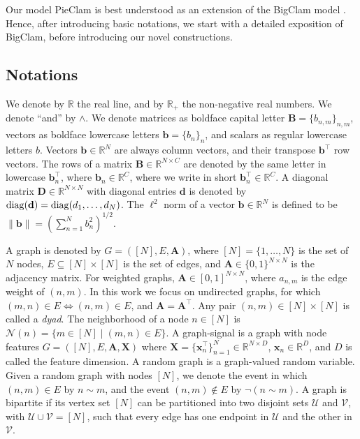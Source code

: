 \documentclass[letterpaper]{article} %
\begin{document}
Our model PieClam is best understood as an extension of the BigClam model \cite{Overlapping2012}. Hence, after introducing basic notations, we start with a detailed exposition of BigClam, before introducing our novel constructions.


\subsection{Notations}
\label{def:notations}
We denote by $\mathbb{R}$ the real line, and by $\mathbb{R}_+$ the non-negative real numbers. We denote ``and'' by $\wedge$.
We denote matrices as boldface capital letter $\mathbf{B}=\{b_{n,m}\}_{n,m}$, vectors as boldface lowercase letters $\mathbf{b}=\{b_n\}_n$,  and scalars as regular lowercase letters $b$. Vectors $\mathbf{b}\in\mathbb{R}^N$ are always column vectors, and their transpose $\mathbf{b}^{\top }$ row vectors. The rows of a matrix $\mathbf{B}\in\mathbb{R}^{N\times C}$ are denoted by the same letter in lowercase $\mathbf{b}_n^{\top }$, where $\mathbf{b}_n\in\mathbb{R}^C$, where we write in short $\mathbf{b}_n^{\top }\in\mathbb{R}^C$. A diagonal matrix $\mathbf{D}\in\mathbb{R}^{N\times N}$ with diagonal entries $\mathbf{d}$ is denoted by ${\rm diag}(\mathbf{d})={\rm diag}(d_1,\ldots, d_N)$.  The $\ell^2$ norm of a vector $\mathbf{b} \in \mathbb{R}^N$ is defined to be $\|\mathbf{b}\| = (\sum_{n=1}^Nb_n^2)^{1/2}$. 

A graph is denoted by $G=([N],E,\mathbf{A})$, where $[N]=\{1,\ldots, N\}$ is the set of $N$ nodes,  $E\subseteq [N]\times[N]$ is the set of edges, and $\mathbf{A}\in \{0,1\}^{N\times N}$ is the adjacency matrix. For weighted graphs, $\mathbf{A}\in[0,1]^{N\times N}$, where $a_{n,m}$ is the edge weight of $(n,m)$.
In this work we focus on undirected graphs, for which $(m,n)\in E \Leftrightarrow (n,m)\in E$, and $\mathbf{A}=\mathbf{A}^{\top }$.  
%
Any pair $(n, m)\in [N]\times[N]$ is called a \emph{dyad}.
The neighborhood of a node $n\in[N]$ is  $\mathcal{N}(n)  = \{m \in [N] \mid (m,n) \in E\}$.
 A graph-signal is a graph with node features  $G=([N],E,\mathbf{A},\mathbf{X})$ where $\mathbf{X}=\{\mathbf{x}_n^{\top }\}_{n=1}^N\in \mathbb{R}^{N\times D}$, $\mathbf{x}_n\in\mathbb{R}^D$, and $D$ is called the feature dimension. 
A random graph is a graph-valued random variable. Given a random graph with nodes $[N]$, 
 we denote the event in which  $(n,m)\in E$ by  $n\sim m$, and the event $(n,m)\notin E$ by $\neg (n\sim m)$.  
%
A graph is bipartite if its vertex set $[N]$ can be partitioned into two disjoint sets $\mathcal{U}$ and $\mathcal{V}$, with  $\mathcal{U}\cup\mathcal{V}=[N]$, such that every edge has one endpoint in $\mathcal{U}$ and the other in $\mathcal{V}$. 
\end{document}
